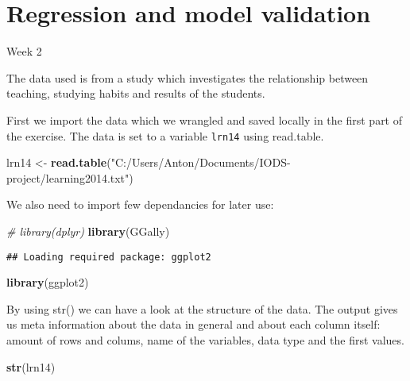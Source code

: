 \documentclass[]{article}
\title{}
\author{}
\date{}
\newenvironment{Shaded}{\begin{snugshade}}{\end{snugshade}}
\newcommand{\KeywordTok}[1]{\textcolor[rgb]{0.13,0.29,0.53}{\textbf{#1}}}
\newcommand{\StringTok}[1]{\textcolor[rgb]{0.31,0.60,0.02}{#1}}
\newcommand{\CommentTok}[1]{\textcolor[rgb]{0.56,0.35,0.01}{\textit{#1}}}
\newcommand{\NormalTok}[1]{#1}
\begin{document}
\section{Regression and model
validation}\label{regression-and-model-validation}

Week 2

The data used is from a study which investigates the relationship
between teaching, studying habits and results of the students.

First we import the data which we wrangled and saved locally in the
first part of the exercise. The data is set to a variable \texttt{lrn14}
using read.table.

\begin{Shaded}
\begin{Highlighting}[]
\NormalTok{lrn14 <-}\StringTok{ }\KeywordTok{read.table}\NormalTok{(}\StringTok{"C:/Users/Anton/Documents/IODS-project/learning2014.txt"}\NormalTok{)}
\end{Highlighting}
\end{Shaded}

We also need to import few dependancies for later use:

\begin{Shaded}
\begin{Highlighting}[]
\CommentTok{# library(dplyr)}
\KeywordTok{library}\NormalTok{(GGally)}
\end{Highlighting}
\end{Shaded}

\begin{verbatim}
## Loading required package: ggplot2
\end{verbatim}

\begin{Shaded}
\begin{Highlighting}[]
\KeywordTok{library}\NormalTok{(ggplot2)}
\end{Highlighting}
\end{Shaded}

By using str() we can have a look at the structure of the data. The
output gives us meta information about the data in general and about
each column itself: amount of rows and colums, name of the variables,
data type and the first values.

\begin{Shaded}
\begin{Highlighting}[]
\KeywordTok{str}\NormalTok{(lrn14)}
\end{Highlighting}
\end{Shaded}
\end{document}
